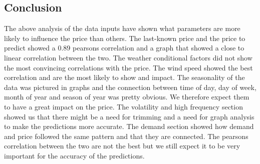 \subsection{Conclusion}
The above analysis of the data inputs have shown what parameters are more likely to influence the price than others. The last-known price and the price to predict showed a 0.89 pearsons correlation and a graph that showed a close to linear correlation between the two. The weather conditional factors did not show the most convincing correlations with the price. The wind speed showed the best correlation and are the most likely to show and impact. The seasonality of the data was pictured in graphs and the connection between time of day, day of week, month of year and season of year was pretty obvious. We therefore expect them to have a great impact on the price. The volatility and high frequency section showed us that there might be a need for trimming and a need for graph analysis to make the predictions more accurate. The demand section showed how demand and price followed the same pattern and that they are connected. The pearsons correlation between the two are not the best but we still expect it to be very important for the accuracy of the predictions.